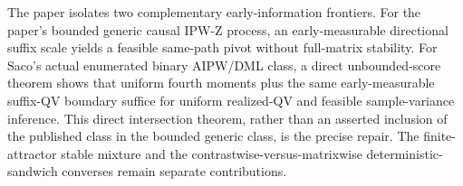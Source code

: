 The paper isolates two complementary early-information frontiers.  For the paper's bounded generic causal IPW-Z process, an early-measurable directional suffix scale yields a feasible same-path pivot without full-matrix stability.  For Saco's actual enumerated binary AIPW/DML class, a direct unbounded-score theorem shows that uniform fourth moments plus the same early-measurable suffix-QV boundary suffice for uniform realized-QV and feasible sample-variance inference.  This direct intersection theorem, rather than an asserted inclusion of the published class in the bounded generic class, is the precise repair.  The finite-attractor stable mixture and the contrastwise-versus-matrixwise deterministic-sandwich converses remain separate contributions.